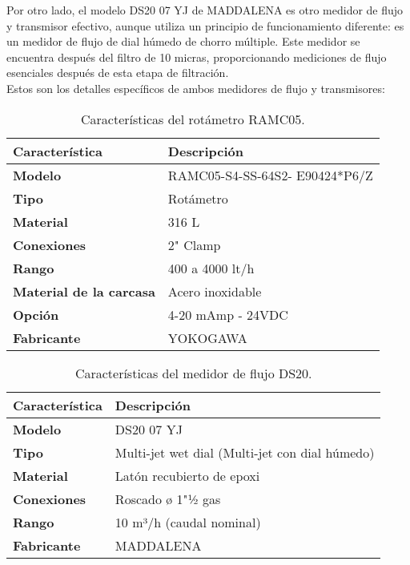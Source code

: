Por otro lado, el modelo DS20 07 YJ de MADDALENA es otro medidor de flujo y transmisor efectivo, aunque utiliza un principio de funcionamiento diferente: es un medidor de flujo de dial húmedo de chorro múltiple. Este medidor se encuentra después del filtro de 10 micras, proporcionando mediciones de flujo esenciales después de esta etapa de filtración.\\

Estos son los detalles específicos de ambos medidores de flujo y transmisores:\\

\begin{table}[H]
    \centering
    \caption{Características del rotámetro RAMC05.}
    \label{table:rotameter}
    \begin{tabular}{| L{5cm} | L{5cm} |}
        \hline
        \textbf{Característica} & \textbf{Descripción}  \\
        \hline
        \textbf{Modelo} & RAMC05-S4-SS-64S2- E90424*P6/Z  \\
        \hline
        \textbf{Tipo} & Rotámetro  \\
        \hline
        \textbf{Material} & 316 L  \\
        \hline
        \textbf{Conexiones} & 2" Clamp  \\
        \hline
        \textbf{Rango} & 400 a 4000 lt/h  \\
        \hline
        \textbf{Material de la carcasa} & Acero inoxidable  \\
        \hline
        \textbf{Opción} & 4-20 mAmp - 24VDC  \\
        \hline
        \textbf{Fabricante} & YOKOGAWA  \\
        \hline
    \end{tabular}
\end{table}


\begin{table}[H]
    \centering
    \caption{Características del medidor de flujo DS20.}
    \label{table:medidor}
    \begin{tabular}{| L{5cm} | L{5cm} |}
        \hline
        \textbf{Característica} & \textbf{Descripción}  \\
        \hline
        \textbf{Modelo} & DS20 07 YJ  \\
        \hline
        \textbf{Tipo} & Multi-jet wet dial (Multi-jet con dial húmedo)  \\
        \hline
        \textbf{Material} & Latón recubierto de epoxi  \\
        \hline
        \textbf{Conexiones} & Roscado ø 1"½ gas  \\
        \hline
        \textbf{Rango} & 10 m³/h (caudal nominal)  \\
        \hline
        \textbf{Fabricante} & MADDALENA  \\
        \hline
    \end{tabular}
\end{table}

